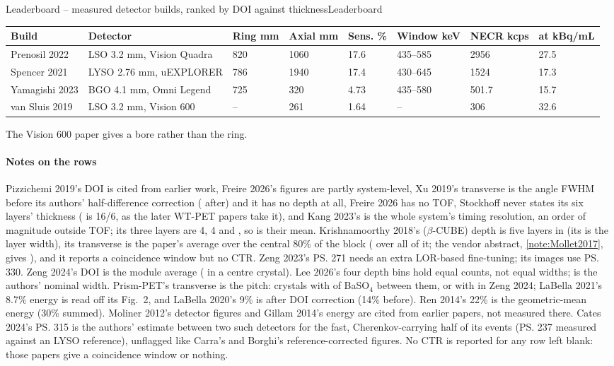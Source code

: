\begin{programnote}{Leaderboard -- measured detector builds, ranked by DOI against thickness}{Leaderboard}
\begin{center}
\begin{scriptsize}
\setlength{\tabcolsep}{2pt}
\begin{tabular}{llllllll}
\hline
Build & Detector & Ring mm & Axial mm & Sens. \% & Window keV & NECR kcps & at kBq/mL \\
\hline
Prenosil 2022 & LSO 3.2 mm, Vision Quadra & 820 & 1060 & 17.6 & 435--585 & 2956 & 27.5 \\
Spencer 2021 & LYSO 2.76 mm, uEXPLORER & 786 & 1940 & 17.4 & 430--645 & 1524 & 17.3 \\
Yamagishi 2023 & BGO 4.1 mm, Omni Legend & 725 & 320 & 4.73 & 435--580 & 501.7 & 15.7 \\
van Sluis 2019 & LSO 3.2 mm, Vision 600 & -- & 261 & 1.64 & -- & 306 & 32.6 \\
\hline
\end{tabular}
\end{scriptsize}
\end{center}
The Vision 600 paper gives a  bore rather than the ring.

\paragraph{Notes on the rows}
Pizzichemi 2019's  DOI is cited from earlier work, Freire 2026's figures
are partly system-level, Xu 2019's transverse is the angle FWHM before its
authors' half-difference correction ( after) and it has no depth at all, Freire 2026 has no TOF, Stockhoff never states its six layers' thickness ( is
16/6, as the later WT-PET papers take it), and Kang 2023's  is the
whole system's timing resolution, an order of magnitude outside TOF; its
three layers are 4, 4 and , so  is their mean. Krishnamoorthy 2018's ($\beta$-CUBE) depth is five
layers in  (its  is the layer width), its  transverse
is the paper's average over the central 80\% of the block ( over all of
it; the vendor abstract, \ref{note:Mollet2017}, gives ), and it reports
a  coincidence window but no CTR.
Zeng 2023's \ps{271} needs an extra LOR-based fine-tuning; its images use \ps{330}.
Zeng 2024's DOI is the module average ( in a centre crystal). Lee
2026's four depth bins hold equal counts, not equal widths;  is the
authors' nominal width.
Prism-PET's transverse is the  pitch:  crystals with
 of BaSO$_4$ between them, or  with  in Zeng 2024; LaBella 2021's 8.7\% energy is read off its
Fig.\ 2, and LaBella 2020's 9\% is after DOI correction (14\% before). Ren
2014's 22\% is the geometric-mean energy (30\% summed). Moliner 2012's detector
figures and Gillam 2014's energy are cited from earlier papers, not measured
there. Cates 2024's \ps{315} is the authors' estimate between two such
detectors for the fast, Cherenkov-carrying half of its events (\ps{237}
measured against an LYSO reference), unflagged like Carra's and Borghi's
reference-corrected figures. No CTR is reported for any row left blank: those papers give a
coincidence window or nothing.


\end{programnote}
